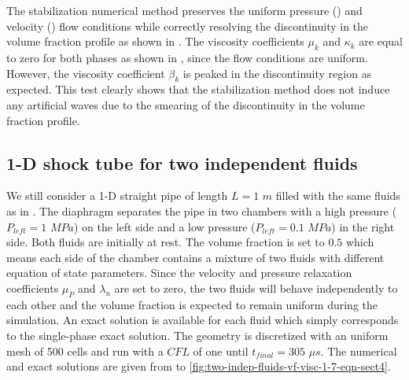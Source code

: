 %
The stabilization numerical method preserves the uniform pressure () and velocity () flow conditions while correctly resolving the discontinuity in the volume fraction profile as shown in . The viscosity coefficients $\mu_k$ and $\kappa_k$ are equal to zero for both phases as shown in , since the flow conditions are uniform. However, the viscosity coefficient $\beta_k$ is peaked in the discontinuity region as expected. This test clearly shows that the stabilization method does not induce any artificial waves due to the smearing of the discontinuity in the volume fraction profile.
\subsection{1-D shock tube for two independent fluids}\label{sec:1d-2-ind-phases-7-eq-sct4}
We still consider a 1-D straight pipe of length $L=1$ $m$ filled with the same fluids as in . The diaphragm separates the pipe in two chambers with a high pressure ($P_{left} = 1$ $MPa$) on the left side and a low pressure ($P_{left} = 0.1$ $MPa$) in the right side. Both fluids are initially at rest. The volume fraction is set to $0.5$ which means each side of the chamber contains a mixture of two fluids with different equation of state parameters. Since the velocity and pressure relaxation coefficients $\mu_P$ and $\lambda_u$ are set to zero, the two fluids will behave independently to each other and the volume fraction is expected to remain uniform during the simulation. An exact solution is available for each fluid which simply corresponds to the single-phase exact solution. The geometry is discretized with an uniform mesh of 500 cells and run with a $CFL$ of one until $t_{final} = 305$ $\mu s$. The numerical and exact solutions are given from  to \ref{fig:two-indep-fluids-vf-visc-1-7-eqn-sect4}.
%
